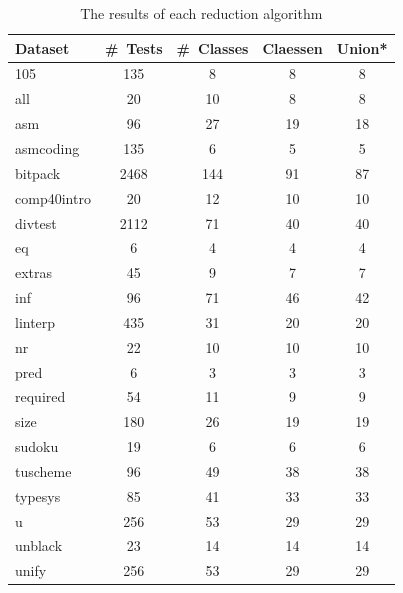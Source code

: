 \documentclass[svgnames]{beamer}
\theoremstyle{definition}
\begin{document}
\begin{frame}
\begin{table}[t]
\def\?{\phantom0}
\centering
\fontsize{8}{3}\selectfont
\begin{tabular}{ | l | c | c | c | c | }
\hline
Dataset & \#~Tests & \#\ Classes &  Claessen &  Union*  \\ 
\hline
105 & \?135 & \?\?8 & \?8 & \?8 \\
all & \?\?20 & \?10 & \?8 & \?8 \\
asm & \?\?96 & \?27 & 19 & 18 \\
asmcoding & \?135 & \?\?6 & \?5 & \?5 \\
bitpack & 2468 & 144 & 91 & 87 \\
comp40intro & \?\?20 & \?12 & 10 & 10 \\
divtest & 2112 & \?71 & 40 & 40 \\
eq & \?\?\?6 & \?\?4 & \?4 & \?4 \\
extras & \?\?45 & \?\?9 & \?7 & \?7 \\
inf & \?\?96 & \?71 & 46 & 42 \\
linterp & \?435 & \?31 & 20 & 20 \\
nr & \?\?22 & \?10 & 10 & 10 \\
pred & \?\?\?6 & \?\?3 & \?3 & \?3 \\
required & \?\?54 & \?11 & \?9 & \?9 \\
size & \?180 & \?26 & 19 & 19 \\
sudoku & \?19 & \?\?6 & \?6 & \?6 \\
tuscheme & \?\?96 & \?49 & 38 & 38 \\
typesys & \?\?85 & \?41 & 33 & 33 \\
u & \?256 & \?53 & 29 & 29 \\
unblack & \?23 & \?14 & 14 & 14 \\
unify & \?256 & \?53 & 29 & 29 \\
\hline
\end{tabular}
\caption{The results of each reduction algorithm}
\end{table}
\end{frame}
\end{document}
